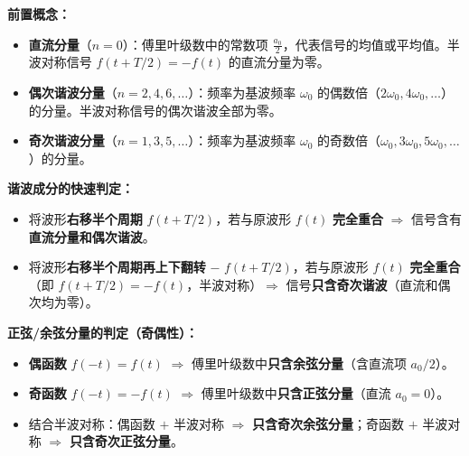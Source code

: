 \documentclass[12pt,a4paper]{ctexart}
\begin{document}
\noindent\textbf{前置概念：}
\begin{itemize}
    \item \textbf{直流分量}（$n=0$）：傅里叶级数中的常数项 $\displaystyle\frac{a_0}{2}$，代表信号的均值或平均值。半波对称信号 $f(t+T/2)=-f(t)$ 的直流分量为零。
    \item \textbf{偶次谐波分量}（$n=2,4,6,\dots$）：频率为基波频率 $\omega_0$ 的偶数倍（$2\omega_0,4\omega_0,\dots$）的分量。半波对称信号的偶次谐波全部为零。
    \item \textbf{奇次谐波分量}（$n=1,3,5,\dots$）：频率为基波频率 $\omega_0$ 的奇数倍（$\omega_0,3\omega_0,5\omega_0,\dots$）的分量。
\end{itemize}

\noindent\textbf{谐波成分的快速判定：}
\begin{itemize}
    \item 将波形\textbf{右移半个周期} $f(t+T/2)$，若与原波形 $f(t)$ \textbf{完全重合} $\Longrightarrow$ 信号含有\textbf{直流分量和偶次谐波}。
    \item 将波形\textbf{右移半个周期再上下翻转} $-$ $f(t+T/2)$，若与原波形 $f(t)$ \textbf{完全重合}（即 $f(t+T/2)=-f(t)$，半波对称）$\Longrightarrow$ 信号\textbf{只含奇次谐波}（直流和偶次均为零）。
\end{itemize}

\noindent\textbf{正弦/余弦分量的判定（奇偶性）：}
\begin{itemize}
    \item \textbf{偶函数} $f(-t)=f(t)$ $\Longrightarrow$ 傅里叶级数中\textbf{只含余弦分量}（含直流项 $a_0/2$）。
    \item \textbf{奇函数} $f(-t)=-f(t)$ $\Longrightarrow$ 傅里叶级数中\textbf{只含正弦分量}（直流 $a_0=0$）。
    \item 结合半波对称：偶函数 $+$ 半波对称 $\Longrightarrow$ \textbf{只含奇次余弦分量}；奇函数 $+$ 半波对称 $\Longrightarrow$ \textbf{只含奇次正弦分量}。
\end{itemize}
\end{document}
